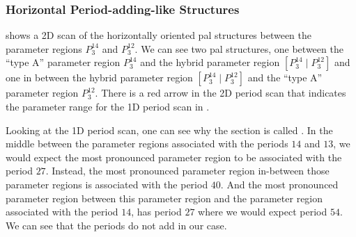 \subsubsection{Horizontal Period-adding-like Structures}

 shows a 2D scan of the horizontally oriented \gls{pal} structures between the parameter regions $P^{14}_3$ and $P^{12}_3$.
We can see two \gls{pal} structures, one between the ``type A'' parameter region $P^{14}_3$ and the hybrid parameter region $\left[P^{14}_3 \mid P^{12}_3\right]$ and one in between the hybrid parameter region $\left[P^{14}_3 \mid P^{12}_3\right]$ and the ``type A'' parameter region $P^{12}_3$.
There is a red arrow in the 2D period scan that indicates the parameter range for the 1D period scan in .

Looking at the 1D period scan, one can see why the section is called .
In the middle between the parameter regions associated with the periods $14$ and $13$, we would expect the most pronounced parameter region to be associated with the period $27$.
Instead, the most pronounced parameter region in-between those parameter regions is associated with the period $40$.
And the most pronounced parameter region between this parameter region and the parameter region associated with the period $14$, has period $27$ where we would expect period $54$.
We can see that the periods do not add in our case.

